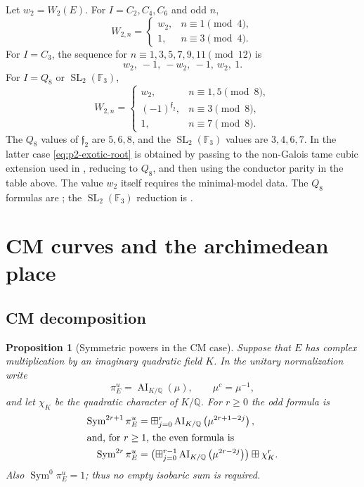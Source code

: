\documentclass[11pt,reqno]{amsart}
\newtheorem{proposition}[theorem]{Proposition}
\theoremstyle{definition}
\theoremstyle{remark}
\newcommand{\Q}{\mathbb Q}
\newcommand{\SL}{\operatorname{SL}}
\newcommand{\Sym}{\operatorname{Sym}}
\newcommand{\AI}{\operatorname{AI}}
\begin{document}
Let $w_2=W_2(E)$.  For $I=C_2,C_4,C_6$ and odd $n$,
\begin{equation}\label{eq:p2-cyclic-root}
 W_{2,n}=
 \begin{cases}
 w_2,&n\equiv1\pmod4,\\
 1,&n\equiv3\pmod4.
 \end{cases}
\end{equation}
For $I=C_3$, the sequence for
$n\equiv1,3,5,7,9,11\pmod{12}$ is
\begin{equation}\label{eq:p2-C3-root}
 w_2,\ -1,\ -w_2,\ -1,\ w_2,\ 1.
\end{equation}
For $I=Q_8$ or $\SL_2(\mathbb F_3)$,
\begin{equation}\label{eq:p2-exotic-root}
 W_{2,n}=
 \begin{cases}
 w_2,&n\equiv1,5\pmod8,\\
 (-1)^{\mathfrak f_2},&n\equiv3\pmod8,\\
 1,&n\equiv7\pmod8.
 \end{cases}
\end{equation}
The $Q_8$ values of $\mathfrak f_2$ are $5,6,8$, and the
$\SL_2(\mathbb F_3)$ values are $3,4,6,7$.  In the latter case
\eqref{eq:p2-exotic-root} is obtained by passing to the non-Galois tame cubic
extension used in \cite{DMW}, reducing to $Q_8$, and then using the conductor
parity in the table above.  The value $w_2$ itself requires the minimal-model
data.
The $Q_8$ formulas are \cite[Propositions~8.1 and 8.2]{DMW}; the
$\SL_2(\mathbb F_3)$ reduction is \cite[Section~10]{DMW}.

\section{CM curves and the archimedean place}\label{app:cm-infinity}

\subsection{CM decomposition}

\begin{proposition}[Symmetric powers in the CM case]\label{prop:CM}
Suppose that $E$ has complex multiplication by an imaginary quadratic field
$K$.  In the unitary normalization write
\begin{equation*}
 \pi_E^u=\AI_{K/\Q}(\mu),
 \qquad
 \mu^c=\mu^{-1},
\end{equation*}
and let $\chi_K$ be the quadratic character of $K/\Q$.  For $r\geq0$ the
odd formula is
\begin{align}
 \Sym^{2r+1}\pi_E^u
 &=
 \boxplus_{j=0}^{r}
 \AI_{K/\Q}\left(\mu^{2r+1-2j}\right),
 \label{eq:CM-odd}\\
 \intertext{and, for $r\geq1$, the even formula is}
 \Sym^{2r}\pi_E^u
 &=
 \left(
 \boxplus_{j=0}^{r-1}
 \AI_{K/\Q}\left(\mu^{2r-2j}\right)
 \right)
 \boxplus\chi_K^r.
 \label{eq:CM-even}
\end{align}
Also $\Sym^0\pi_E^u=1$; thus no empty isobaric sum is required.
\end{proposition}
\end{document}
